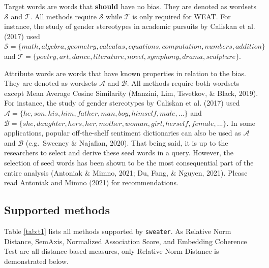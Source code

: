 \documentclass[english,man]{apa6}
\begin{document}
Target words are words that \textbf{should} have no bias. They are denoted as wordsets \(\mathcal{S}\) and \(\mathcal{T}\). All methods require \(\mathcal{S}\) while \(\mathcal{T}\) is only required for WEAT. For instance, the study of gender stereotypes in academic pursuits by Caliskan et al. (2017) used \(\mathcal{S} = \{math, algebra, geometry, calculus, equations, computation, numbers, addition\}\) and \(\mathcal{T}= \{poetry, art, dance, literature, novel, symphony, drama, sculpture\}\).

Attribute words are words that have known properties in relation to the bias. They are denoted as wordsets \(\mathcal{A}\) and \(\mathcal{B}\). All methods require both wordsets except Mean Average Cosine Similarity (Manzini, Lim, Tsvetkov, \& Black, 2019). For instance, the study of gender stereotypes by Caliskan et al. (2017) used \(\mathcal{A} = \{he, son, his, him, father, man, boy, himself, male, ...\}\) and \(\mathcal{B} = \{she, daughter, hers, her, mother, woman, girl, herself, female, ...\}\). In some applications, popular off-the-shelf sentiment dictionaries can also be used as \(\mathcal{A}\) and \(\mathcal{B}\) (e.g.~Sweeney \& Najafian, 2020). That being said, it is up to the researchers to select and derive these seed words in a query. However, the selection of seed words has been shown to be the most consequential part of the entire analysis (Antoniak \& Mimno, 2021; Du, Fang, \& Nguyen, 2021). Please read Antoniak and Mimno (2021) for recommendations.

\hypertarget{supported-methods}{%
\subsection{Supported methods}\label{supported-methods}}

Table \ref{tab:t1} lists all methods supported by \texttt{sweater}. As Relative Norm Distance, SemAxis, Normalized Association Score, and Embedding Coherence Test are all distance-based measures, only Relative Norm Distance is demonstrated below.
\end{document}
